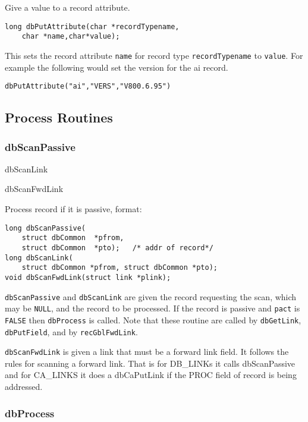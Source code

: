 Give a value to a record attribute.

\begin{verbatim}
long dbPutAttribute(char *recordTypename,
    char *name,char*value);
\end{verbatim}

This sets the record attribute \verb|name| for record type \verb|recordTypename| to \verb|value|.
For example the following would set the version for the ai record.

\begin{verbatim}
dbPutAttribute("ai","VERS","V800.6.95")
\end{verbatim}

\subsection{Process Routines}

\subsubsection{dbScanPassive}

dbScanLink

dbScanFwdLink

Process record if it is passive, format:

\begin{verbatim}
long dbScanPassive(
    struct dbCommon  *pfrom,
    struct dbCommon  *pto);   /* addr of record*/
long dbScanLink(
    struct dbCommon *pfrom, struct dbCommon *pto);
void dbScanFwdLink(struct link *plink);
\end{verbatim}

 \verb|dbScanPassive| and \verb|dbScanLink| are given the record requesting the scan, which may be \verb|NULL|, and the record to be processed.
If the record is passive and \verb|pact| is \verb|FALSE| then \verb|dbProcess| is called.
Note that these routine are called by \verb|dbGetLink|, \verb|dbPutField|, and by \verb|recGblFwdLink|.

\verb|dbScanFwdLink| is given a link that must be a forward link field.
It follows the rules for scanning a forward link.
That is for DB\_LINKs it calls dbScanPassive and for CA\_LINKS it does a dbCaPutLink if the PROC field of record is being addressed.

\subsubsection{dbProcess }

